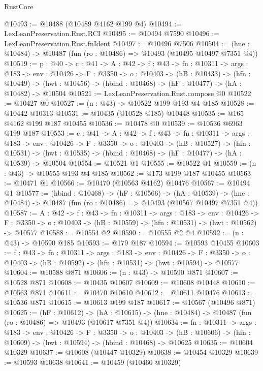 \begin{lexlean}{RustCore}
\begin{coremodule}
@10493 := @10488 (@10489 @4162 @199 @4)
@10494 := LexLeanPreservation.Rust.RCI
@10495 := @10494 @7590
@10496 := LexLeanPreservation.Rust.fnIdent
@10497 := @10496 @7506
@10504 := (hne : @10484) -> @10487 (fun (ro : @10486) => @10493 (@10495 @10497 @7351 @4))
@10519 := {p : @40} ->
  {c : @41} ->
  {A : @42} ->
  {f : @43} ->
  {fn : @10311} ->
  {args : @183} ->
  {env : @10426} ->
  {F : @3350} ->
  {o : @10403} ->
  (hB : @10433) ->
  (hfn : @10449) -> (hwt : @10456) -> (hbind : @10468) -> (hF : @10477) -> (hA : @10482) -> @10504
@10521 := LexLeanPreservation.Rust.compose @0
@10522 := @10427 @0
@10527 := (n : @43) -> @10522 @199 @193 @4 @185
@10528 := @10442 @10313
@10531 := @10435 (@10528 @185) @10448
@10535 := @165 @4162 @199 @187 @10455
@10536 := @10478 @0
@10539 := @10536 @6963 @199 @187
@10553 := {c : @41} ->
  {A : @42} ->
  {f : @43} ->
  {fn : @10311} ->
  {args : @183} ->
  {env : @10426} ->
  {F : @3350} ->
  {o : @10403} ->
  (hB : @10527) ->
  (hfn : @10531) -> (hwt : @10535) -> (hbind : @10468) -> (hF : @10477) -> (hA : @10539) -> @10504
@10554 := @10521 @1
@10555 := @10522 @1
@10559 := (n : @43) -> @10555 @193 @4 @185
@10562 := @173 @199 @187 @10455
@10563 := @10471 @1
@10566 := @10470 (@10563 @4162) @10476
@10567 := @10494 @1
@10577 := (hbind : @10468) ->
  (hF : @10566) ->
  (hA : @10539) -> (hne : @10484) -> @10487 (fun (ro : @10486) => @10493 (@10567 @10497 @7351 @4))
@10587 := {A : @42} ->
  {f : @43} ->
  {fn : @10311} ->
  {args : @183} ->
  {env : @10426} ->
  {F : @3350} -> {o : @10403} -> (hB : @10559) -> (hfn : @10531) -> (hwt : @10562) -> @10577
@10588 := @10554 @2
@10590 := @10555 @2 @4
@10592 := (n : @43) -> @10590 @185
@10593 := @179 @187
@10594 := @10593 @10455
@10603 := {f : @43} ->
  {fn : @10311} ->
  {args : @183} ->
  {env : @10426} ->
  {F : @3350} -> {o : @10403} -> (hB : @10592) -> (hfn : @10531) -> (hwt : @10594) -> @10577
@10604 := @10588 @871
@10606 := (n : @43) -> @10590 @871
@10607 := @10528 @871
@10608 := @10435 @10607
@10609 := @10608 @10448
@10610 := @10563 @871
@10611 := @10470 @10610
@10612 := @10611 @10476
@10613 := @10536 @871
@10615 := @10613 @199 @187
@10617 := @10567 (@10496 @871)
@10625 := (hF : @10612) ->
  (hA : @10615) -> (hne : @10484) -> @10487 (fun (ro : @10486) => @10493 (@10617 @7351 @4))
@10634 := {fn : @10311} ->
  {args : @183} ->
  {env : @10426} ->
  {F : @3350} ->
  {o : @10403} -> (hB : @10606) -> (hfn : @10609) -> (hwt : @10594) -> (hbind : @10468) -> @10625
@10635 := @10604 @10329
@10637 := @10608 (@10447 @10329)
@10638 := @10454 @10329
@10639 := @10593 @10638
@10641 := @10459 (@10460 @10329)

\end{coremodule}
\end{lexlean}

